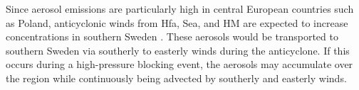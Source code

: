 Since aerosol emissions are particularly high in central European countries such as Poland, anticyclonic winds from Hfa, Sea, and HM are expected to increase \PM  concentrations in southern Sweden \cite{europeanenvironmentagencyEuropesAirQuality2024}. These aerosols would be transported to southern Sweden via southerly to easterly winds during the anticyclone. If this occurs during a high-pressure blocking event, the aerosols may accumulate over the region while continuously being advected by southerly and easterly winds. 